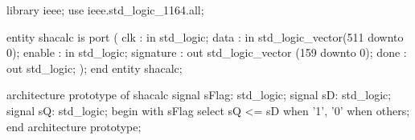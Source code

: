 library ieee;
use ieee.std_logic_1164.all;

entity shacalc is
    port (
        clk : in std_logic;
        data : in std_logic_vector(511 downto 0);
        enable : in std_logic;
        signature : out std_logic_vector (159 downto 0);
        done : out std_logic;
    );
end entity shacalc;

architecture prototype of shacalc
    signal sFlag: std_logic;
    signal sD: std_logic;
    signal sQ: std_logic;
begin
    with sFlag select
	  sQ <= sD  when '1',
		'0' when others;
end architecture prototype;